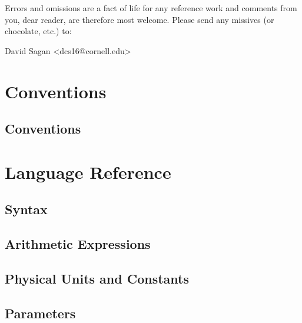 \documentclass{book}
\begin{document}
Errors and omissions are a fact of life for any reference work and
comments from you, dear reader, are therefore most welcome. Please
send any missives (or chocolate, etc.) to:
\begin{tty}
  David Sagan <dcs16@cornell.edu>
\end{tty}


\tableofcontents

\listoffigures

\listoftables

\part{Conventions}

\chapter{Conventions}


\part{Language Reference}


\chapter{Syntax}

\chapter{Arithmetic Expressions}

\chapter{Physical Units and Constants}

\chapter{Parameters}
\end{document}
